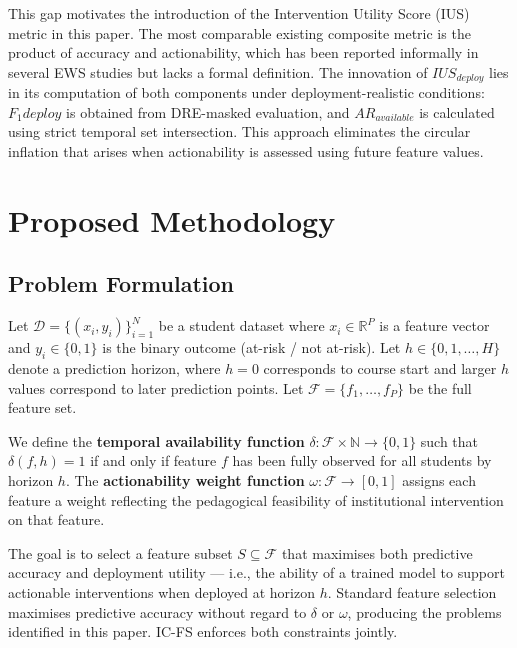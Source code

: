\documentclass[a4paper,fleqn]{cas-sc}
\begin{document}
This gap motivates the introduction of the Intervention Utility Score (IUS) metric in this paper. The most comparable existing composite metric is the product of accuracy and actionability, which has been reported informally in several EWS studies but lacks a formal definition. The innovation of $IUS_{deploy}$ lies in its computation of both components under deployment-realistic conditions: $F_1{deploy}$ is obtained from DRE-masked evaluation, and $AR_{available}$ is calculated using strict temporal set intersection. This approach eliminates the circular inflation that arises when actionability is assessed using future feature values.



\section{Proposed Methodology}
\label{sec:methodology}

\subsection{Problem Formulation}

Let $\mathcal{D} = \{(x_i, y_i)\}_{i=1}^{N}$ be a student dataset where $x_i \in \mathbb{R}^P$ is a feature vector and $y_i \in \{0, 1\}$ is the binary outcome (at-risk / not at-risk). Let $h \in \{0, 1, \ldots, H\}$ denote a prediction horizon, where $h=0$ corresponds to course start and larger $h$ values correspond to later prediction points. Let $\mathcal{F} = \{f_1, \ldots, f_P\}$ be the full feature set.

We define the \textbf{temporal availability function} $\delta: \mathcal{F} \times \mathbb{N} \to \{0,1\}$ such that $\delta(f, h) = 1$ if and only if feature $f$ has been fully observed for all students by horizon $h$. The \textbf{actionability weight function} $\omega: \mathcal{F} \to [0,1]$ assigns each feature a weight reflecting the pedagogical feasibility of institutional intervention on that feature.

The goal is to select a feature subset $S \subseteq \mathcal{F}$ that maximises both predictive accuracy and deployment utility --- i.e., the ability of a trained model to support actionable interventions when deployed at horizon $h$. Standard feature selection maximises predictive accuracy without regard to $\delta$ or $\omega$, producing the problems identified in this paper. IC-FS enforces both constraints jointly.
\end{document}
